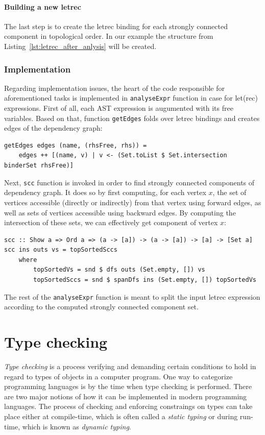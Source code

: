 \documentclass[12pt,a4paper]{report}
\begin{document}
\subsubsection{Building a new letrec}
The last step is to create the letrec binding for each strongly
connected component in topological order. In our example the structure from
Listing~\ref{lst:letrec_after_anlysis} will be created.


\subsection{Implementation}
Regarding implementation issues, the heart of the code responsible for
aforementioned tasks is implemented in \texttt{analyseExpr} function in case
for let(rec) expressions. First of all, each AST expression is
augumented with its free variables. Based on that, function \texttt{getEdges}
folds over letrec bindings and creates edges of the dependency graph:

\vspace*{0.2in}
\begin{lstlisting}[style=haskell]
getEdges edges (name, (rhsFree, rhs)) =
    edges ++ [(name, v) | v <- (Set.toList $ Set.intersection binderSet rhsFree)]
\end{lstlisting}

Next, \texttt{scc} function is invoked in order to find strongly connected
components of dependency graph. It does so by first computing, for each vertex
$x$, the set of vertices accessible (directly or indirectly) from that vertex
using forward edges, as well as sets of vertices accessible using backward
edges. By computing the intersection of these sets, we can effectively get
component of vertex $x$:

\vspace*{0.2in}
\begin{lstlisting}[style=haskell]
scc :: Show a => Ord a => (a -> [a]) -> (a -> [a]) -> [a] -> [Set a]
scc ins outs vs = topSortedSccs
    where
        topSortedVs = snd $ dfs outs (Set.empty, []) vs
        topSortedSccs = snd $ spanDfs ins (Set.empty, []) topSortedVs
\end{lstlisting}

The rest of the \texttt{analyseExpr} function is meant to split the input
letrec expression according to the computed strongly connected
component set.

\chapter{Type checking}
\textit{Type checking} is a process verifying and demanding certain conditions
to hold in regard to types of objects in a computer program. One way to
categorize programming languages is by the time when type checking is
performed. There are two major notions of how it can be implemented in modern
programming languages. The process of checking and enforcing constraings on
types can take place either at compile-time, which is often called a
\textit{static typing} or during run-time, which is known as \textit{dynamic
typing}.
\end{document}
